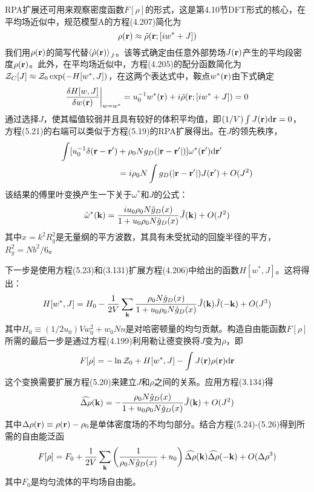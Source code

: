 RPA扩展还可用来观察密度函数$F[\rho]$的形式，这是第4.10节DFT形式的核心，在平均场近似中，规范模型A的方程(4.207)简化为
\begin{equation}
\rho(\mathbf{r})\approx\tilde{\rho}(\mathbf{r};[iw^*+J])
\end{equation}
我们用$\rho(\mathbf{r})$的简写代替$\left\langle\hat{\rho}(\mathbf{r})\right\rangle_J$。该等式确定由任意外部势场$J(\mathbf{r})$产生的平均段密度$\rho(\mathbf{r})$。此外，在平均场近似中，方程(4.205)的配分函数简化为$\mathcal{Z}_C[J]\approx\mathcal{Z}_0\exp(-H[w^*,J])$，在这两个表达式中，鞍点$w^*(\mathbf{r})$由下式确定
\begin{equation}
\frac{\delta H[w,J]}{\delta w(\mathbf{r})}\bigg|_{w=w^*}=u_0^{-1}w^*(\mathbf{r})+i\tilde{\rho}(\mathbf{r};[iw^*+J])=0
\end{equation}
通过选择$J$，使其幅值较弱并且具有较好的体积平均值，即$(1/V)\int J(\mathbf{r})\mathrm{d}\mathbf{r}=0$，方程(5.21)的右端可以类似于方程(5.19)的RPA扩展得出。在$J$的领先秩序，
\begin{equation}
\begin{aligned}
\int[u_0^{-1}\delta(\mathbf{r}-\mathbf{r}')&+\rho_0Ng_D(\left|\mathbf{r}-\mathbf{r}'\right|)]\omega^*(\mathbf{r}')\mathrm{d}\mathbf{r}'\\
&=i\rho_0N\int g_D(\left|\mathbf{r}-\mathbf{r}'\right|)J(\mathbf{r}')+O(J^2)
\end{aligned}
\end{equation}
该结果的傅里叶变换产生一下关于$\omega^*$和$J$的公式：
\begin{equation}
\hat{\omega}^*(\mathbf{k})=\frac{iu_0\rho_0N\hat{g}_D(x)}{1+u_0\rho_0N\hat{g}_D(x)}\hat{J}(\mathbf{k})+O(J^2)
\end{equation}
其中$x=k^2R_g^2$是无量纲的平方波数，其具有未受扰动的回旋半径的平方，$R_g^2=Nb^2/6$。

下一步是使用方程(5.23)和(3.131)扩展方程(4.206)中给出的函数$H[w^*,J]$。这将得出：
\begin{equation}
H[w^*,J]=H_0-\frac{1}{2V}\sum\limits_{\mathbf{k}}\frac{\rho_0N\hat{g}_D(x)}{1+u_0\rho_0N\hat{g}_D(x)}\hat{J}(\mathbf{k})\hat{J}(-\mathbf{k})+O(J^3)
\end{equation}
其中$H_0\equiv(1/2u_0)Vw_0^2+w_0Nn$是对哈密顿量的均匀贡献。构造自由能函数$F[\rho]$所需的最后一步是通过方程(4.199)利用勒让德变换将$J$变为$\rho$，即
\begin{equation}
F[\rho]=-\ln\mathcal{Z}_0+H[w^*,J]-\int J(\mathbf{r})\rho(\mathbf{r})\mathrm{d}\mathbf{r}
\end{equation}
这个变换需要扩展方程(5.20)来建立$J$和$\rho$之间的关系。应用方程(3.134)得
\begin{equation}
\widehat{\Delta\rho}(\mathbf{k})=-\frac{\rho_0N\hat{g}_D(x)}{1+u_0\rho_0N\hat{g}_D(x)}\hat{J}(\mathbf{k})+O(J^2)
\end{equation}
其中$\Delta\rho(\mathbf{r})\equiv\rho(\mathbf{r})-\rho_0$是单体密度场的不均匀部分。结合方程(5.24)-(5.26)得到所需的自由能泛函
\begin{equation}
F[\rho]=F_0+\frac{1}{2V}\sum\limits_{\mathbf{k}}\left(\frac{1}{\rho_0N\hat{g}_D(x)}+u_0\right)\widehat{\Delta\rho}(\mathbf{k})\widehat{\Delta\rho}(-\mathbf{k})+O(\Delta\rho^3)
\end{equation}
其中$F_0$是均匀流体的平均场自由能。

